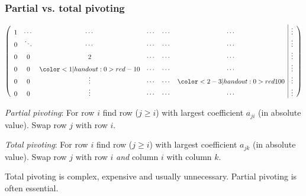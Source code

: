 \documentclass{beamer}
\begin{document}
\begin{frame}
  \frametitle{Partial vs. total pivoting}
    
  {
    \footnotesize
    \renewcommand{\arraystretch}{-1.2}
  \begin{equation*}
    \left(
      \begin{array}{c c c c c c|c}
        1 & \cdots & \cdots & \cdots & \cdots & \cdots & \vdots \\
        0 & \ddots & \cdots & \cdots & \cdots & \cdots & \vdots \\
        0 & 0 & 2 & \cdots & \cdots & \cdots & \vdots \\
        0 & 0 & \color<1|handout:0>{red}-10 & \cdots & \cdots & \cdots & \vdots \\
        0 & 0 & \vdots & \cdots & \cdots & \color<2-3|handout:0>{red}100 & \vdots \\
        0 & 0 & \vdots & \cdots & \cdots & \cdots & \vdots \\
      \end{array}
    \right)
  \end{equation*}
  }

  \emph{Partial pivoting}: For row $i$ find row ($j \geq i$) with
  largest coefficient $a_{ji}$ (in absolute value). Swap row $j$ with
  row $i$. \pause

  \vspace{1ex}

  \emph{Total pivoting}: For row $i$ find row ($j \geq i$) with
  largest coefficient $a_{jk}$ (in absolute value). Swap row $j$ with
  row $i$ \emph{and} column $i$ with column $k$. \pause

  \vspace{1ex}

  Total pivoting is complex, expensive and usually
  unnecessary. Partial pivoting is often essential.

\end{frame}
\end{document}
